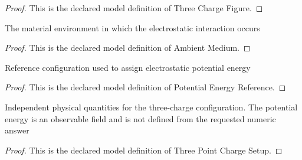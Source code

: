\begin{proof}
  This is the declared model definition of Three Charge Figure.
\end{proof}
\begin{definition}
  \label{def:physics:phyx-mini-0855:phyxminiproblems-problemphyxmini0855-ambientmedium}
  The material environment in which the electrostatic interaction occurs
\end{definition}
\begin{proof}
  This is the declared model definition of Ambient Medium.
\end{proof}
\begin{definition}
  \label{def:physics:phyx-mini-0855:phyxminiproblems-problemphyxmini0855-potentialenergyreference}
  Reference configuration used to assign electrostatic potential energy
\end{definition}
\begin{proof}
  This is the declared model definition of Potential Energy Reference.
\end{proof}
\begin{definition}
  \label{def:physics:phyx-mini-0855:phyxminiproblems-problemphyxmini0855-threepointchargesetup}
  Independent physical quantities for the three-charge configuration. The potential energy is an observable field and is not defined from the requested numeric answer
\end{definition}
\begin{proof}
  This is the declared model definition of Three Point Charge Setup.
\end{proof}
